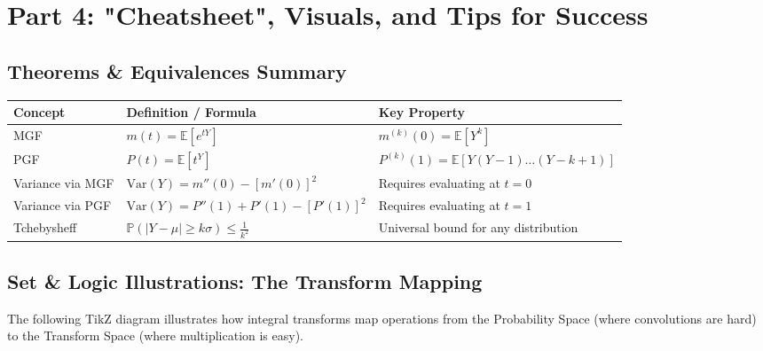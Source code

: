 \documentclass[11pt, a4paper]{article}
\theoremstyle{definition}
\theoremstyle{remark}
\newcommand{\E}{\mathbb{E}}
\newcommand{\Var}{\mathrm{Var}}
\newcommand{\Prob}{\mathbb{P}}
\begin{document}
\newpage
\section{Part 4: "Cheatsheet", Visuals, and Tips for Success}

\subsection{Theorems \& Equivalences Summary}
\begin{table}[h!]
\centering
\renewcommand{\arraystretch}{1.5}
\begin{tabular}{|l|l|l|}
\hline
\textbf{Concept} & \textbf{Definition / Formula} & \textbf{Key Property} \\ \hline
MGF & $m(t) = \E[e^{tY}]$ & $m^{(k)}(0) = \E[Y^k]$ \\ \hline
PGF & $P(t) = \E[t^Y]$ & $P^{(k)}(1) = \E[Y(Y-1)\dots(Y-k+1)]$ \\ \hline
Variance via MGF & $\Var(Y) = m''(0) - [m'(0)]^2$ & Requires evaluating at $t=0$ \\ \hline
Variance via PGF & $\Var(Y) = P''(1) + P'(1) - [P'(1)]^2$ & Requires evaluating at $t=1$ \\ \hline
Tchebysheff & $\Prob(|Y - \mu| \ge k\sigma) \le \frac{1}{k^2}$ & Universal bound for any distribution \\ \hline
\end{tabular}
\end{table}

\subsection{Set \& Logic Illustrations: The Transform Mapping}
The following TikZ diagram illustrates how integral transforms map operations from the Probability Space (where convolutions are hard) to the Transform Space (where multiplication is easy).
\end{document}
